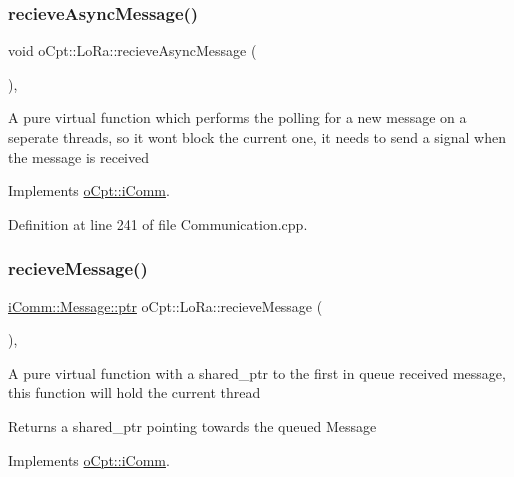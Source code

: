 \subsubsection{\texorpdfstring{recieve\+Async\+Message()}{recieveAsyncMessage()}}
{\footnotesize\ttfamily void o\+Cpt\+::\+Lo\+Ra\+::recieve\+Async\+Message (\begin{DoxyParamCaption}{ }\end{DoxyParamCaption})\hspace{0.3cm}{\ttfamily [override]}, {\ttfamily [virtual]}}

A pure virtual function which performs the polling for a new message on a seperate threads, so it won\textquotesingle{}t block the current one, it needs to send a signal when the message is received 

Implements \hyperlink{classo_cpt_1_1i_comm_a27a57fb90cfc9cce21552e8539f08dd7}{o\+Cpt\+::i\+Comm}.



Definition at line 241 of file Communication.\+cpp.

\hypertarget{classo_cpt_1_1_lo_ra_a191e265a569a80c53e6829d57d402969}{}\label{classo_cpt_1_1_lo_ra_a191e265a569a80c53e6829d57d402969} 
\subsubsection{\texorpdfstring{recieve\+Message()}{recieveMessage()}}
{\footnotesize\ttfamily \hyperlink{structo_cpt_1_1i_comm_1_1_message_ad2ba828ad76f96a30e3898b2609a4c01}{i\+Comm\+::\+Message\+::ptr} o\+Cpt\+::\+Lo\+Ra\+::recieve\+Message (\begin{DoxyParamCaption}{ }\end{DoxyParamCaption})\hspace{0.3cm}{\ttfamily [override]}, {\ttfamily [virtual]}}

A pure virtual function with a shared\+\_\+ptr to the first in queue received message, this function will hold the current thread \begin{DoxyReturn}{Returns}
a shared\+\_\+ptr pointing towards the queued Message 
\end{DoxyReturn}


Implements \hyperlink{classo_cpt_1_1i_comm_a054ee0448f0d2773abce97c424c5c20c}{o\+Cpt\+::i\+Comm}.



